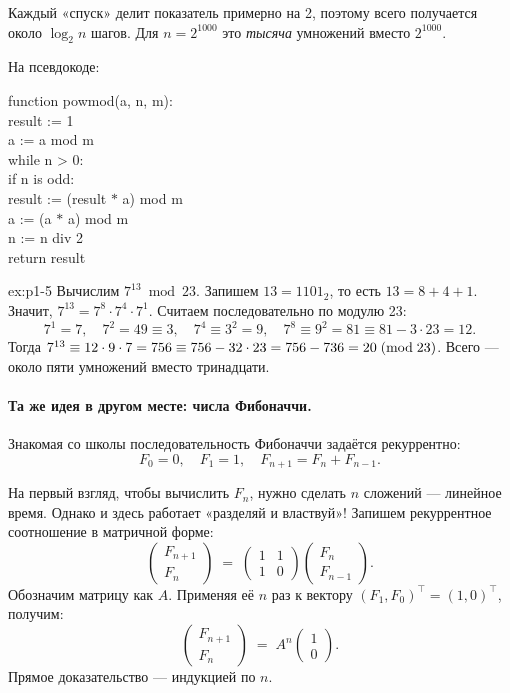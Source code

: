 \noindent
Каждый «спуск» делит показатель примерно на 2, поэтому всего получается около $\log_2 n$ шагов. Для $n = 2^{1000}$ это \emph{тысяча} умножений вместо $2^{1000}$.

На псевдокоде:
\begin{center}
\begin{minipage}{0.78\linewidth}
\ttfamily\small
\noindent
function powmod(a, n, m):\\
\quad result := 1\\
\quad a := a mod m\\
\quad while n > 0:\\
\qquad if n is odd:\\
\quad\qquad result := (result $\ast$ a) mod m\\
\qquad a := (a $\ast$ a) mod m\\
\qquad n := n div 2\\
\quad return result
\end{minipage}
\end{center}

\begin{example}{}{ex:p1-5}
Вычислим $7^{13} \bmod 23$. Запишем $13 = 1101_2$, то есть $13 = 8 + 4 + 1$. Значит, $7^{13} = 7^{8}\cdot 7^{4}\cdot 7^{1}$. Считаем последовательно по модулю 23:
\[
7^1 = 7,\quad 7^2 = 49 \equiv 3,\quad 7^4 \equiv 3^2 = 9,\quad 7^8 \equiv 9^2 = 81 \equiv 81 - 3\cdot 23 = 12.
\]
Тогда $7^{13} \equiv 12\cdot 9\cdot 7 = 756 \equiv 756 - 32\cdot 23 = 756 - 736 = 20 \;(\mathrm{mod}\;23)$. Всего --- около пяти умножений вместо тринадцати.
\end{example}

\paragraph*{Та же идея в другом месте: числа Фибоначчи.} Знакомая со школы последовательность Фибоначчи задаётся рекуррентно:
\[
F_0 = 0,\quad F_1 = 1,\quad F_{n+1} = F_n + F_{n-1}.
\]

На первый взгляд, чтобы вычислить $F_n$, нужно сделать $n$ сложений --- линейное время. Однако и здесь работает «разделяй и властвуй»! Запишем рекуррентное соотношение в матричной форме:
\[
\begin{pmatrix} F_{n+1} \\ F_n \end{pmatrix}
\;=\;
\begin{pmatrix} 1 & 1 \\ 1 & 0 \end{pmatrix}
\begin{pmatrix} F_n \\ F_{n-1} \end{pmatrix}.
\]
Обозначим матрицу как $A$. Применяя её $n$ раз к вектору $(F_1, F_0)^\top = (1,0)^\top$, получим:
\[
\begin{pmatrix} F_{n+1} \\ F_n \end{pmatrix}
\;=\;
A^n
\begin{pmatrix} 1 \\ 0 \end{pmatrix}.
\]
Прямое доказательство --- индукцией по $n$.

